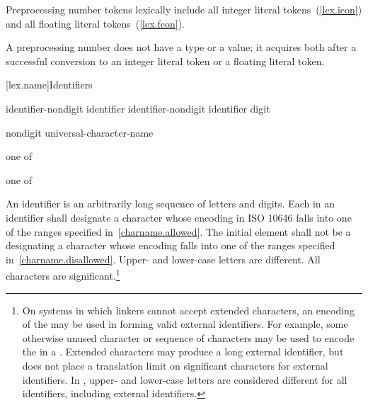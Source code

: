 \pnum
Preprocessing number tokens lexically include all integer literal
tokens~(\ref{lex.icon}) and all floating literal
tokens~(\ref{lex.fcon}).

\pnum
A preprocessing number does not have a type or a value; it acquires both
after a successful conversion to an integer literal token or a floating literal
token.%

[lex.name]{Identifiers}

%
\begin{bnf}
\br
    identifier-nondigit\br
    identifier identifier-nondigit\br
    identifier digit
\end{bnf}

\begin{bnf}
\br
    nondigit\br
    universal-character-name
\end{bnf}

\begin{bnf}
 \textnormal{one of}\br
    \br
    \br
    \br
\end{bnf}

\begin{bnf}
 \textnormal{one of}\br
\end{bnf}

\pnum
{}%
%
An identifier is an arbitrarily long sequence of letters and digits.
Each  in an identifier shall designate a
character whose encoding in ISO 10646 falls into one of the ranges
specified in~\ref{charname.allowed}.
The initial element shall not be a 
designating a character whose encoding falls into one of the ranges
specified in~\ref{charname.disallowed}.
Upper- and lower-case letters are
different. All characters are significant.\footnote{On systems in which linkers cannot accept extended
characters, an encoding of the  may be used in
forming valid external identifiers. For example, some otherwise unused
character or sequence of characters may be used to encode the
 in a . Extended
characters may produce a long external identifier, but \Cpp does not
place a translation limit on significant characters for external
identifiers. In \Cpp, upper- and lower-case letters are considered
different for all identifiers, including external identifiers. }


